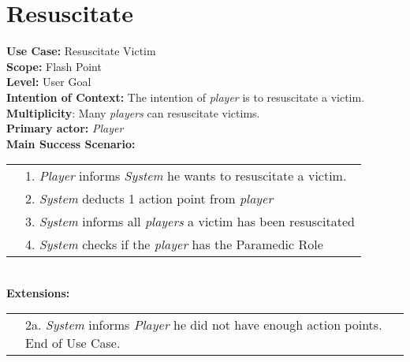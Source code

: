 \documentclass{article}
\begin{document}
	\section*{Resuscitate}
	\textbf{Use Case:} Resuscitate Victim\\
	\textbf{Scope:} Flash Point\\
	\textbf{Level:} User Goal\\
	\textbf{Intention of Context:} The intention of \textit{player} is to resuscitate a victim.\\
	\textbf{Multiplicity}: Many \textit{players} can resuscitate victims.\\
	\textbf{Primary actor:} \textit{Player}\\
	\textbf{Main Success Scenario:}\\
	\begin{tabular}{l l}
		&1. \textit{Player} informs \textit{System} he wants to resuscitate a victim.\\
		&2. \textit{System} deducts 1 action point from \textit{player}\\
		&3. \textit{System} informs all \textit{players} a victim has been resuscitated\\
		&4. \textit{System} checks if the \textit{player} has the Paramedic Role\\
	\end{tabular}\\
	\textbf{Extensions:}\\
	\begin{tabular}{l l}
		&2a. \textit{System} informs \textit{Player} he did not have enough action points. End of Use Case.
	\end{tabular}
\end{document}

